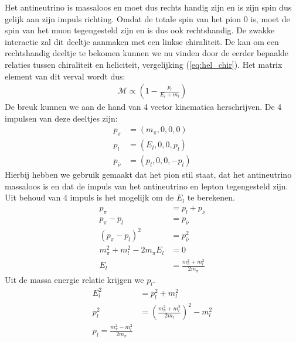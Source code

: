 \documentclass[../main.tex]{subfiles}
\begin{document}
Het antineutrino is massaloos en moet dus rechts handig zijn en is zijn spin dus gelijk aan zijn impuls richting. Omdat de totale spin van het pion 0 is, moet de spin van het muon tegengesteld zijn en is dus ook rechtshandig. De zwakke interactie zal dit deeltje aanmaken met een linkse chiraliteit. De kan om een rechtshandig deeltje te bekomen kunnen we nu vinden door de eerder bepaalde relaties tussen chiraliteit en heliciteit, vergelijking (\ref{eq:hel_chir}). Het matrix element van dit verval wordt dus:
\begin{equation}
    \begin{aligned}
        \label{eq:pion_verval_matrix}
        \mathcal{M} \propto \left( 1 - \frac{p_l}{E_l + m_l} \right)
    \end{aligned}
\end{equation}
De breuk kunnen we aan de hand van 4 vector kinematica herschrijven. De 4 impulsen van deze deeltjes zijn:
\begin{equation}
    \begin{aligned}
        \label{eq:4_impuls_pion_verval}
        p_\pi &= (m_\pi,0,0,0)\\
        p_l &= (E_l, 0, 0, p_l)\\
        p_{\overline \nu} &= (p_l, 0, 0, -p_l)
    \end{aligned}
\end{equation}
Hierbij hebben we gebruik gemaakt dat het pion stil staat, dat het antineutrino massaloos is en dat de impuls van het antineutrino en lepton tegengesteld zijn. Uit behoud van 4 impuls is het mogelijk om de $E_l$ te berekenen.
\begin{equation}
    \begin{aligned}
        \label{eq:berekenen_e_l}
        p_\pi &= p_l + p_{\overline \nu}\\
        p_\pi - p_l &= p_{\overline \nu}\\
        (p_\pi - p_l)^2 &= p_{\overline \nu}^2\\
        m_\pi^2+m_l^2-2m_\pi E_l &= 0\\
        E_l &= \frac{m_\pi^2 + m_l^2}{2m_\pi}
    \end{aligned}
\end{equation}
Uit de massa energie relatie krijgen we $p_l$.
\begin{equation}
    \begin{aligned}
        \label{eq:berekenen_p_l}
        E_l^2 &= p_l^2 + m_l^2\\
        p_l^2 &= \left( \frac{m_\pi^2+m_l^2}{2m_l} \right)^2-m_l^2\\
        p_l = \frac{m_\pi^2-m_l^2}{2m_\pi} 
    \end{aligned}
\end{equation}
\end{document}
